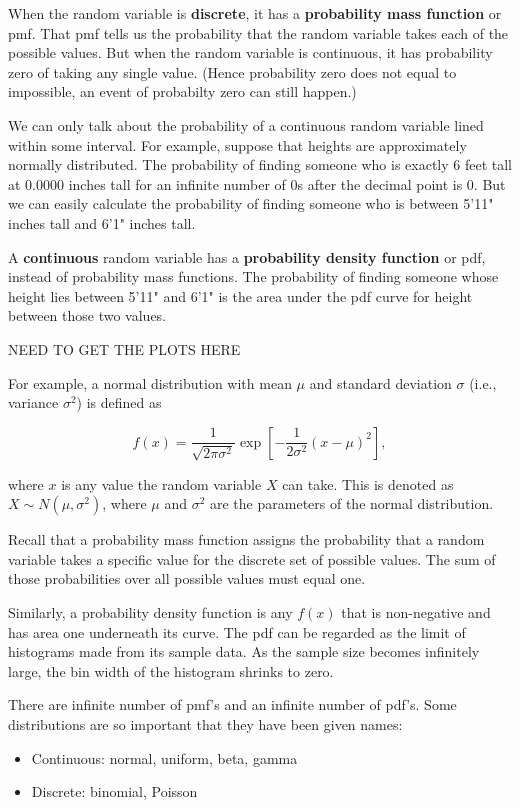 \documentclass[]{book}
\theoremstyle{definition}
\theoremstyle{definition}
\theoremstyle{remark}
\begin{document}
When the random variable is \textbf{discrete}, it has a
\textbf{probability mass function} or pmf. That pmf tells us the
probability that the random variable takes each of the possible values.
But when the random variable is continuous, it has probability zero of
taking any single value. (Hence probability zero does not equal to
impossible, an event of probabilty zero can still happen.)

We can only talk about the probability of a continuous random variable
lined within some interval. For example, suppose that heights are
approximately normally distributed. The probability of finding someone
who is exactly 6 feet tall at 0.0000 inches tall for an infinite number
of 0s after the decimal point is 0. But we can easily calculate the
probability of finding someone who is between 5'11" inches tall and 6'1"
inches tall.

A \textbf{continuous} random variable has a \textbf{probability density
function} or pdf, instead of probability mass functions. The probability
of finding someone whose height lies between 5'11" and 6'1" is the area
under the pdf curve for height between those two values.

NEED TO GET THE PLOTS HERE

For example, a normal distribution with mean \(\mu\) and standard
deviation \(\sigma\) (i.e., variance \(\sigma^2\)) is defined as

\[f(x) = \frac{1}{\sqrt{2 \pi \sigma^2}} \exp[-\frac{1}{2\sigma^2}(x-\mu)^2],\]

where \(x\) is any value the random variable \(X\) can take. This is
denoted as \(X \sim N(\mu,\sigma^2)\), where \(\mu\) and \(\sigma^2\)
are the parameters of the normal distribution.

Recall that a probability mass function assigns the probability that a
random variable takes a specific value for the discrete set of possible
values. The sum of those probabilities over all possible values must
equal one.

Similarly, a probability density function is any \(f(x)\) that is
non-negative and has area one underneath its curve. The pdf can be
regarded as the limit of histograms made from its sample data. As the
sample size becomes infinitely large, the bin width of the histogram
shrinks to zero.

There are infinite number of pmf's and an infinite number of pdf's. Some
distributions are so important that they have been given names:

\begin{itemize}
\item
  Continuous: normal, uniform, beta, gamma
\item
  Discrete: binomial, Poisson
\end{itemize}
\end{document}
